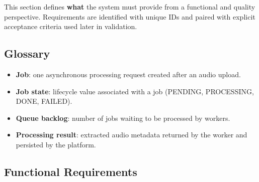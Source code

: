 \documentclass{scrartcl}
\begin{document}


This section defines \textbf{what} the system must provide from a functional and quality perspective.
Requirements are identified with unique IDs and paired with explicit acceptance criteria used later in validation.

\subsection*{Glossary}

\begin{itemize}
  \item \textbf{Job}: one asynchronous processing request created after an audio upload.
  \item \textbf{Job state}: lifecycle value associated with a job (PENDING, PROCESSING, DONE, FAILED).
  \item \textbf{Queue backlog}: number of jobs waiting to be processed by workers.
  \item \textbf{Processing result}: extracted audio metadata returned by the worker and persisted by the platform.
\end{itemize}

\subsection*{Functional Requirements}
\end{document}
